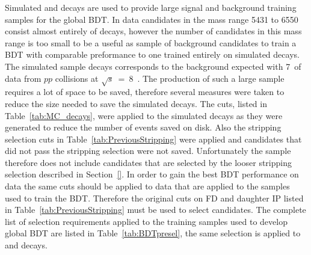 Simulated \bsmumu and \bbbarmumux decays are used to provide large signal and background training samples for the global BDT. In data \bsmumu candidates in the mass range 5431 to 6550 \mevcc consist almost entirely of \bbbarmumux decays, however the number of candidates in this mass range is too small to be a useful as sample of background candidates to train a BDT with comparable preformance to one trained entirely on simulated decays. 
The simulated sample \bbbarmumux decays corresponds to the background expected with 7~\fb of data from $pp$ collisions at $\sqrt{s}$~=~8~\tev. The production of such a large sample requires a lot of space to be saved, therefore several measures were taken to reduce the size needed to save the simulated \bbbarmumux decays. The cuts, listed in Table~\ref{tab:MC_decays}, were applied to the simulated decays as they were generated to reduce the number of events saved on disk. Also the stripping selection cuts in Table~\ref{tab:PreviousStripping} were applied and candidates that did not pass the stripping selection were not saved. Unfortunately the \bbbarmumux sample therefore does not include candidates that are selected by the looser stripping selection described in Section~\ref{}. In order to gain the best BDT performance on data the same cuts should be applied to data that are applied to the samples used to train the BDT. Therefore the original cuts on FD \chisqd and daughter IP \chisqd listed in Table~\ref{tab:PreviousStripping} must be used to select \bsmumu candidates. 
The complete list of selection requirements applied to the training samples used to develop global BDT are listed in Table~\ref{tab:BDTpresel}, the same selection is applied to \bsmumu and \bbbarmumux decays.  
